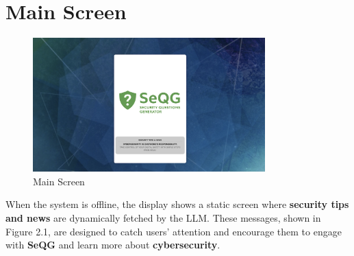\section{Main Screen}
\begin{figure}[H]
    \centering
    \includegraphics[width=0.8\textwidth]{images/MainScreen1.png}
    \caption{Main Screen}
\end{figure}

When the system is offline, the display shows a static screen where \textbf{security tips and news} are 
dynamically fetched by the LLM. These messages, shown in Figure 2.1, are designed to catch users’ attention 
and encourage them to engage with \textbf{SeQG} and learn more about \textbf{cybersecurity}.

